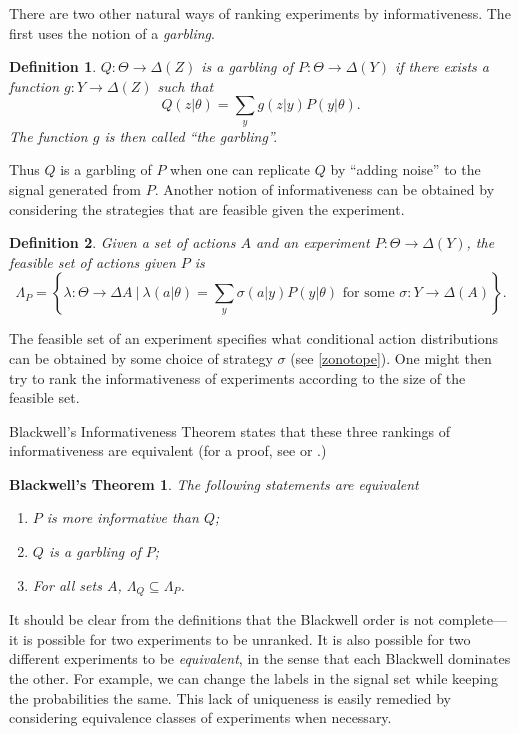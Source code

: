 \documentclass[11pt]{article}
\newtheorem*{thmbw}{Blackwell's Theorem}
\theoremstyle{plain}
\newtheorem{defn}{Definition}
\theoremstyle{remark}
\begin{document}
There are two other natural ways of ranking experiments by informativeness. The first uses the notion of a \emph{garbling}.
\begin{defn}
$Q:\Theta\rightarrow\Delta(Z)$  is a garbling of $P:\Theta\rightarrow\Delta(Y)$ if there exists a function $g:Y\rightarrow \Delta(Z)$ such that 
\[
Q(z|\theta)=\sum_{y}g(z|y)P(y|\theta).
\]
The function $g$ is then called ``the garbling''.
\end{defn}
Thus $Q$ is a garbling of $P$ when one can replicate $Q$ by ``adding noise'' to the signal generated from $P$. Another notion of informativeness can be obtained by considering the strategies that are feasible given the experiment. 
\begin{defn}
Given a set of actions $A$ and an experiment $P:\Theta\rightarrow\Delta(Y)$, the feasible set of actions given $P$ is  
\[
\Lambda_P=\left\{\lambda:\Theta\rightarrow \Delta A\:\Big|\:\lambda(a|\theta)=\sum_y \sigma(a|y)P(y|\theta) \text{ for some } \sigma:Y\rightarrow \Delta(A)\right\}.
\]
\end{defn}
The feasible set of an experiment specifies what conditional action distributions can be obtained by some choice of strategy $\sigma$ (see \autoref{zonotope}). One might then try to rank the informativeness of experiments according to the size of the feasible set.

Blackwell's Informativeness Theorem states that these three rankings of informativeness are equivalent (for a proof, see \citet{blackwell1953equivalent} or \citet{de2018blackwell}.)


\begin{thmbw}
The following statements are equivalent
\begin{enumerate}
    \item $P$ is more informative than $Q$;
    \item $Q$ is a garbling of $P$;
    \item For all sets $A$, $\Lambda_Q\subseteq \Lambda_P$.
\end{enumerate}
\end{thmbw}

It should be clear from the definitions that the Blackwell order is not complete---it is possible for two experiments to be unranked. It is also possible for two different experiments to be \emph{equivalent}, in the sense that each Blackwell dominates the other. For example, we can change the labels in the signal set while keeping the probabilities the same. This lack of uniqueness is easily remedied by considering equivalence classes of experiments when necessary.
\end{document}
